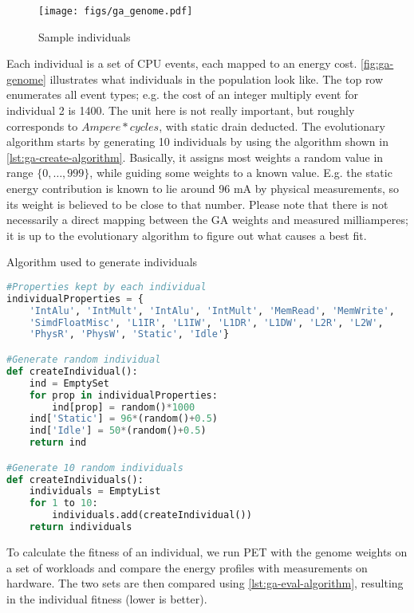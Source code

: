 \begin{figure}
    \centering
    \def\svgwidth{\columnwidth}
    \texttt{[image: figs/ga\_genome.pdf]}
    \caption{Sample individuals}
    \label{fig:ga-genome}
\end{figure}

Each individual is a set of CPU events, each mapped to an energy cost.
\autoref{fig:ga-genome} illustrates what individuals in the population look
like. The top row enumerates all event types; e.g. the cost of an integer
multiply event for individual 2 is 1400. The unit here is not really important,
but roughly corresponds to $Ampere * cycles$, with static drain deducted. The
evolutionary algorithm starts by generating 10 individuals by using the
algorithm shown in \autoref{lst:ga-create-algorithm}. Basically, it assigns most
weights a random value in range $\{0, \ldots, 999\}$, while guiding some weights
to a known value. E.g. the static energy contribution is known to lie around 96
mA by physical measurements, so its weight is believed to be close to that
number. Please note that there is not necessarily a direct mapping between the
GA weights and measured milliamperes; it is up to the evolutionary algorithm to
figure out what causes a best fit.

\begin{algorithm}
\caption{Algorithm used to generate individuals}
\label{lst:ga-create-algorithm}
\begin{lstlisting}[language=python,style=algo]
#Properties kept by each individual
individualProperties = {
    'IntAlu', 'IntMult', 'IntAlu', 'IntMult', 'MemRead', 'MemWrite',
    'SimdFloatMisc', 'L1IR', 'L1IW', 'L1DR', 'L1DW', 'L2R', 'L2W',
    'PhysR', 'PhysW', 'Static', 'Idle'}

#Generate random individual
def createIndividual():
    ind = EmptySet
    for prop in individualProperties:
        ind[prop] = random()*1000
    ind['Static'] = 96*(random()+0.5)
    ind['Idle'] = 50*(random()+0.5)
    return ind

#Generate 10 random individuals
def createIndividuals():
    individuals = EmptyList
    for 1 to 10:
        individuals.add(createIndividual())
    return individuals
\end{lstlisting}
\end{algorithm}

To calculate the fitness of an individual, we run PET with the genome weights on
a set of workloads and compare the energy profiles with measurements on
hardware. The two sets are then compared using \autoref{lst:ga-eval-algorithm},
resulting in the individual fitness (lower is better).

